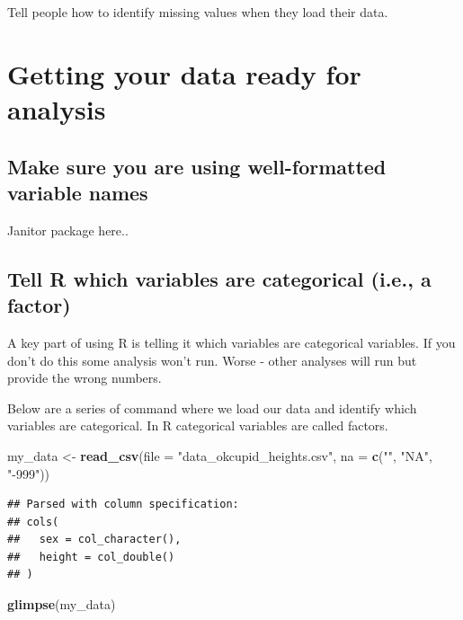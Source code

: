 \documentclass[
]{krantz}
\makeatletter
\newenvironment{Shaded}{\begin{snugshade}}{\end{snugshade}}
\newcommand{\DataTypeTok}[1]{\textcolor[rgb]{0.27,0.27,0.27}{#1}}
\newcommand{\KeywordTok}[1]{\textcolor[rgb]{0.27,0.27,0.27}{\textbf{#1}}}
\newcommand{\NormalTok}[1]{#1}
\newcommand{\StringTok}[1]{\textcolor[rgb]{0.5,0.5,0.5}{#1}}
\newenvironment{kframe}{%
\medskip{}
\setlength{\fboxsep}{.8em}
 \def\at@end@of@kframe{}%
 \ifinner\ifhmode%
  \def\at@end@of@kframe{\end{minipage}}%
  \begin{minipage}{\columnwidth}%
 \fi\fi%
 \def\FrameCommand##1{\hskip\@totalleftmargin \hskip-\fboxsep
 \colorbox{shadecolor}{##1}\hskip-\fboxsep
     \hskip-\linewidth \hskip-\@totalleftmargin \hskip\columnwidth}%
 \MakeFramed {\advance\hsize-\width
   \@totalleftmargin\z@ \linewidth\hsize
   \@setminipage}}%
 {\par\unskip\endMakeFramed%
 \at@end@of@kframe}
\renewenvironment{Shaded}{\begin{kframe}}{\end{kframe}}
\makeatother
\begin{document}
Tell people how to identify missing values when they load their data.

\hypertarget{getting-your-data-ready-for-analysis}{%
\section{Getting your data ready for analysis}\label{getting-your-data-ready-for-analysis}}

\hypertarget{make-sure-you-are-using-well-formatted-variable-names}{%
\subsection{Make sure you are using well-formatted variable names}\label{make-sure-you-are-using-well-formatted-variable-names}}

Janitor package here..

\hypertarget{tell-r-which-variables-are-categorical-i.e.-a-factor}{%
\subsection{Tell R which variables are categorical (i.e., a factor)}\label{tell-r-which-variables-are-categorical-i.e.-a-factor}}

A key part of using R is telling it which variables are categorical variables. If you don't do this some analysis won't run. Worse - other analyses will run but provide the wrong numbers.

Below are a series of command where we load our data and identify which variables are categorical. In R categorical variables are called factors.

\begin{Shaded}
\begin{Highlighting}[]
\NormalTok{my_data <-}\StringTok{ }\KeywordTok{read_csv}\NormalTok{(}\DataTypeTok{file =} \StringTok{"data_okcupid_heights.csv"}\NormalTok{, }
                    \DataTypeTok{na =} \KeywordTok{c}\NormalTok{(}\StringTok{""}\NormalTok{, }\StringTok{"NA"}\NormalTok{, }\StringTok{"-999"}\NormalTok{))}
\end{Highlighting}
\end{Shaded}

\begin{verbatim}
## Parsed with column specification:
## cols(
##   sex = col_character(),
##   height = col_double()
## )
\end{verbatim}

\begin{Shaded}
\begin{Highlighting}[]
\KeywordTok{glimpse}\NormalTok{(my_data)}
\end{Highlighting}
\end{Shaded}
\end{document}
